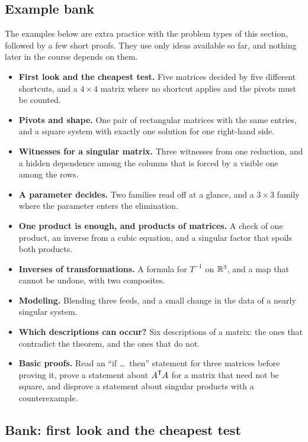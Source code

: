 \documentclass[11pt]{article}
\begin{document}
\subsection*{Example bank}

The examples below are extra practice with the problem types of this section, followed by a few short proofs. They use only ideas available so far, and nothing later in the course depends on them.

\begin{remark}
\begin{itemize}
  \item \textbf{First look and the cheapest test.} Five matrices decided by five different shortcuts, and a $4\times4$ matrix where no shortcut applies and the pivots must be counted.
  \item \textbf{Pivots and shape.} One pair of rectangular matrices with the same entries, and a square system with exactly one solution for one right-hand side.
  \item \textbf{Witnesses for a singular matrix.} Three witnesses from one reduction, and a hidden dependence among the columns that is forced by a visible one among the rows.
  \item \textbf{A parameter decides.} Two families read off at a glance, and a $3\times3$ family where the parameter enters the elimination.
  \item \textbf{One product is enough, and products of matrices.} A check of one product, an inverse from a cubic equation, and a singular factor that spoils both products.
  \item \textbf{Inverses of transformations.} A formula for $T^{-1}$ on $\mathbb{R}^3$, and a map that cannot be undone, with two composites.
  \item \textbf{Modeling.} Blending three feeds, and a small change in the data of a nearly singular system.
  \item \textbf{Which descriptions can occur?} Six descriptions of a matrix: the ones that contradict the theorem, and the ones that do not.
  \item \textbf{Basic proofs.} Read an ``if \dots\ then'' statement for three matrices before proving it, prove a statement about $A^{\mathsf T} A$ for a matrix that need not be square, and disprove a statement about singular products with a counterexample.
\end{itemize}
\end{remark}

\subsection*{Bank: first look and the cheapest test}
\end{document}
